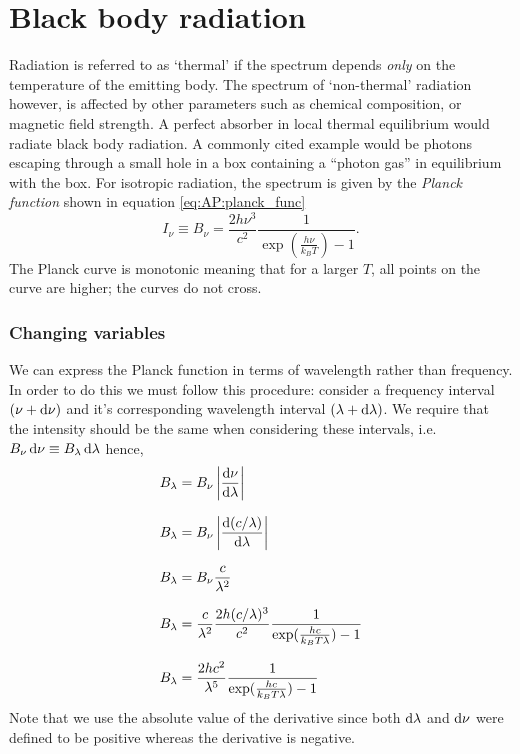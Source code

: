 \section{Black body radiation}
Radiation is referred to as `thermal' if the spectrum depends \emph{only} on the temperature of the emitting body.
 The spectrum of `non-thermal' radiation however, is affected by other parameters such as chemical composition, or magnetic field strength.
 A perfect absorber in local thermal equilibrium would radiate black body radiation.
 A commonly cited example would be photons escaping through a small hole in a box containing a ``photon gas'' in equilibrium with the box.
 For isotropic radiation, the spectrum is given by the \emph{Planck function} shown in equation \ref{eq:AP:planck_func}
%
\begin{equation}
	I_\nu \equiv B_\nu = \frac{2 h \nu ^3}{c^2} \frac{1}{\exp(\frac{h \nu}{k_B T}) - 1}.
	\label{eq:AP:planck_func}
\end{equation}
%
The Planck curve is monotonic meaning that for a larger $T$, all points on the curve are higher; the curves do not cross.
%
\subsubsection{Changing variables}
We can express the Planck function in terms of wavelength rather than frequency.
 In order to do this we must follow this procedure:
 consider a frequency interval $(\nu + \mathop{}\!\mathrm{d} \nu)$ and it's corresponding wavelength interval $(\lambda + \mathop{}\!\mathrm{d} \lambda)$.
 We require that the intensity should be the same when considering these intervals, i.e.\ $B_\nu \mathop{}\!\mathrm{d} \nu \equiv B_\lambda \mathop{}\!\mathrm{d} \lambda$ hence,
%
\begin{align}
	B_\lambda &= B_\nu \left| \frac{\diff\nu}{\diff\lambda} \right|				\nonumber
	\linedrop
	B_\lambda &= B_\nu \left| \frac{\diff (c/\lambda)}{\diff\lambda}\right|		\nonumber
	\linedrop
	B_\lambda &= B_\nu \frac{c}{\lambda^2}										\nonumber
	\linedrop
	B_\lambda &= \frac{c}{\lambda^2} \frac{2 h (c/\lambda)^3}{c^2} \frac{1}{\exp(\frac{h c}{k_B T \lambda}) - 1} \nonumber
	\linedrop
	B_\lambda &= \frac{2 h c^2}{\lambda^5} \frac{1}{\exp(\frac{h c}{k_B T \lambda}) - 1}
\end{align}
%
Note that we use the absolute value of the derivative since both $\mathop{}\!\mathrm{d}\lambda$ and $\mathop{}\!\mathrm{d}\nu$ were defined to be positive whereas the derivative is negative.            
%

